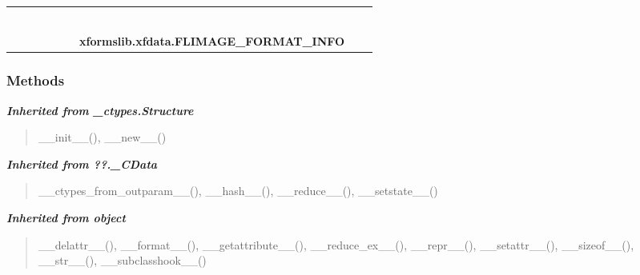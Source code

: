    \label{xformslib:xfdata:FLIMAGE_FORMAT_INFO}
\begin{tabular}{cccccccccc}
\multicolumn{2}{r}{\settowidth{\BCL}{object}\multirow{2}{\BCL}{object}}
&&
&&
&&
  \\\cline{3-3}
  &&\multicolumn{1}{c|}{}
&&
&&
&&
  \\
\multicolumn{4}{r}{\settowidth{\BCL}{??.\_CData}\multirow{2}{\BCL}{??.\_CData}}
&&
&&
  \\\cline{5-5}
  &&&&\multicolumn{1}{c|}{}
&&
&&
  \\
\multicolumn{6}{r}{\settowidth{\BCL}{\_ctypes.Structure}\multirow{2}{\BCL}{\_ctypes.Structure}}
&&
  \\\cline{7-7}
  &&&&&&\multicolumn{1}{c|}{}
&&
  \\
&&&&&&\multicolumn{2}{l}{\textbf{xformslib.xfdata.FLIMAGE\_FORMAT\_INFO}}
\end{tabular}



  \subsubsection{Methods}


\large{\textbf{\textit{Inherited from \_ctypes.Structure}}}

\begin{quote}
\_\_init\_\_(), \_\_new\_\_()
\end{quote}

\large{\textbf{\textit{Inherited from ??.\_CData}}}

\begin{quote}
\_\_ctypes\_from\_outparam\_\_(), \_\_hash\_\_(), \_\_reduce\_\_(), \_\_setstate\_\_()
\end{quote}

\large{\textbf{\textit{Inherited from object}}}

\begin{quote}
\_\_delattr\_\_(), \_\_format\_\_(), \_\_getattribute\_\_(), \_\_reduce\_ex\_\_(), \_\_repr\_\_(), \_\_setattr\_\_(), \_\_sizeof\_\_(), \_\_str\_\_(), \_\_subclasshook\_\_()
\end{quote}

